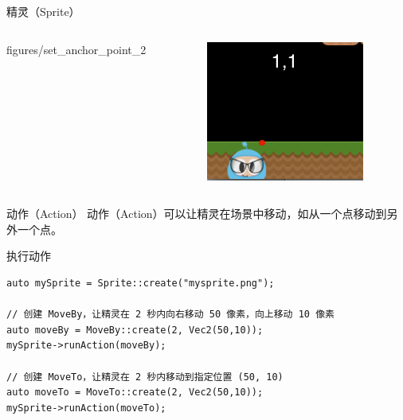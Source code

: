 \documentclass{beamer}
\begin{document}
\begin{frame}[fragile]{精灵（Sprite）}
\begin{columns}
\begin{column}{0.3\textwidth}
{figures/set_anchor_point_2}
\end{column}
\begin{column}{0.3\textwidth}
\includegraphics[width=\textwidth]
{figures/set_anchor_point_3}
\end{column}
\end{columns}
\end{frame}


\begin{frame}[fragile]{动作（Action）}
动作（Action）可以让精灵在场景中移动，如从一个点移动到另外一个点。
\begin{block}{执行动作}
\begin{verbatim}
auto mySprite = Sprite::create("mysprite.png");

// 创建 MoveBy，让精灵在 2 秒内向右移动 50 像素，向上移动 10 像素
auto moveBy = MoveBy::create(2, Vec2(50,10));
mySprite->runAction(moveBy);

// 创建 MoveTo，让精灵在 2 秒内移动到指定位置 (50, 10)
auto moveTo = MoveTo::create(2, Vec2(50,10));
mySprite->runAction(moveTo);
\end{verbatim}
\end{block}
\end{frame}

\end{document}
